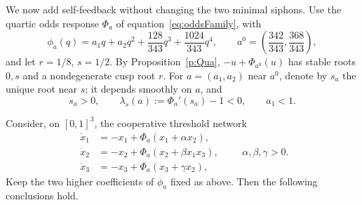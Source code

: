 We now add self-feedback without changing the two minimal
siphons. Use the quartic odds response $\Phi_a$ of
equation~\eqref{eq:oddsFamily}, with
\[
 \phi_a(q)=a_1q+a_2q^2+\frac{128}{343}q^3
                    +\frac{1024}{343}q^4,\qquad
 a^0=\left(\frac{342}{343},\frac{368}{343}\right),
\]
and let $r=1/8$, $s=1/2$. By Proposition~\ref{p:Qua},
$-u+\Phi_{a^0}(u)$ has stable roots $0,s$ and a nondegenerate
cusp root $r$. For $a=(a_1,a_2)$ near $a^0$, denote by
$s_a$ the unique root near $s$; it depends smoothly on $a$,
and
\[
 s_a>0,\qquad \lambda_s(a):=\Phi_a'(s_a)-1<0,
 \qquad a_1<1.
\]


\label{t:KBoverlapCusp}
Consider, on $[0,1]^3$, the cooperative threshold network
\begin{equation}\label{eq:KBoverlapCusp}
\begin{aligned}
 \dot x_1&=-x_1+\Phi_a(x_1+\alpha x_2),\\
 \dot x_2&=-x_2+\Phi_a(x_2+\beta x_1x_3),\\
 \dot x_3&=-x_3+\Phi_a(x_3+\gamma x_2),
\end{aligned}
\qquad \alpha,\beta,\gamma>0.
\end{equation}
Keep the two higher coefficients of $\phi_a$ fixed as above.
Then the following conclusions hold.
